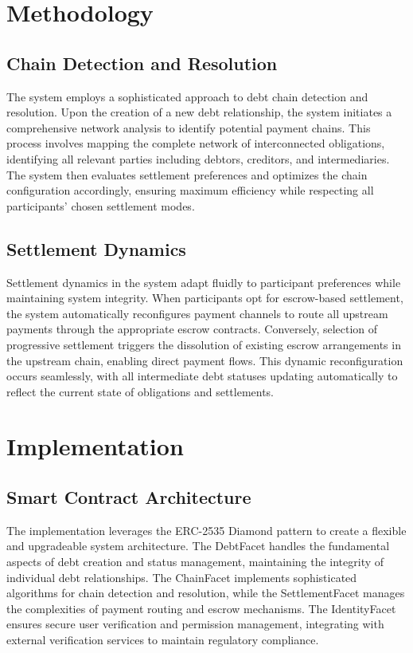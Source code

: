 \documentclass[twocolumn,10pt,a4paper]{article}
\begin{document}
\section{Methodology}
\subsection{Chain Detection and Resolution}
The system employs a sophisticated approach to debt chain detection and resolution. Upon the creation of a new debt relationship, the system initiates a comprehensive network analysis to identify potential payment chains. This process involves mapping the complete network of interconnected obligations, identifying all relevant parties including debtors, creditors, and intermediaries. The system then evaluates settlement preferences and optimizes the chain configuration accordingly, ensuring maximum efficiency while respecting all participants' chosen settlement modes.

\subsection{Settlement Dynamics}
Settlement dynamics in the system adapt fluidly to participant preferences while maintaining system integrity. When participants opt for escrow-based settlement, the system automatically reconfigures payment channels to route all upstream payments through the appropriate escrow contracts. Conversely, selection of progressive settlement triggers the dissolution of existing escrow arrangements in the upstream chain, enabling direct payment flows. This dynamic reconfiguration occurs seamlessly, with all intermediate debt statuses updating automatically to reflect the current state of obligations and settlements.

\section{Implementation}
\subsection{Smart Contract Architecture}
The implementation leverages the ERC-2535 Diamond pattern to create a flexible and upgradeable system architecture. The DebtFacet handles the fundamental aspects of debt creation and status management, maintaining the integrity of individual debt relationships. The ChainFacet implements sophisticated algorithms for chain detection and resolution, while the SettlementFacet manages the complexities of payment routing and escrow mechanisms. The IdentityFacet ensures secure user verification and permission management, integrating with external verification services to maintain regulatory compliance.
\clearpage
\onecolumn  %
\end{document}
